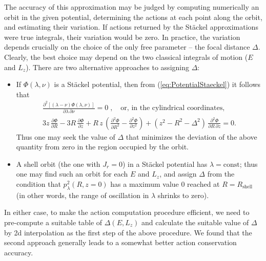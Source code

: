 \documentclass[12pt]{article}
\newcommand{\D}{\partial}
\begin{document}
The accuracy of this approximation may be judged by computing numerically an orbit in the given potential, determining the actions at each point along the orbit, and estimating their variation. If actions returned by the St\"ackel approximations were true integrals, their variation would be zero. In practice, the variation depends crucially on the choice of the only free parameter -- the focal distance $\Delta$. Clearly, the best choice may depend on the two classical integrals of motion ($E$ and $L_z$). There are two alternative approaches to assigning $\Delta$:
\begin{itemize}
\item If $\Phi(\lambda,\nu)$ is a St\"ackel potential, then from (\ref{eq:PotentialStaeckel}) it follows that 
\begin{subequations}
\begin{align}
\frac{\D ^2 [ (\lambda-\nu) \Phi(\lambda,\nu)] }{\D \lambda\,\D \nu} = 0\;,
\quad\mbox{or, in the cylindrical coordinates,} \\
3 z\, \frac{\D \Phi}{\D R} - 3 R\, \frac{\D \Phi}{\D z} +
R\,z\,\left(\frac{\D ^2\Phi}{\D R^2} - \frac{\D ^2\Phi}{\D z^2}\right) +
(z^2 - R^2 - \Delta^2)\,\frac{\D ^2\Phi}{\D R\,\D z} = 0 .
\end{align}
\end{subequations}
Thus one may seek the value of $\Delta$ that minimizes the deviation of the above quantity from zero in the region occupied by the orbit.
\item A shell orbit (the one with $J_r=0$) in a St\"ackel potential has $\lambda=\mathrm{const}$; thus one may find such an orbit for each $E$ and $L_z$, %
and assign $\Delta$ from the condition that $p_\lambda^2(R,z=0)$ has a maximum value 0 reached at $R=R_\mathrm{shell}$ (in other words, the range of oscillation in $\lambda$ shrinks to zero).
\end{itemize}
In either case, to make the action computation procedure efficient, we need to pre-compute a suitable table of $\Delta(E,L_z)$ and calculate the suitable value of $\Delta$ by 2d interpolation as the first step of the above procedure.
We found that the second approach generally leads to a somewhat better action conservation accuracy.
\end{document}
